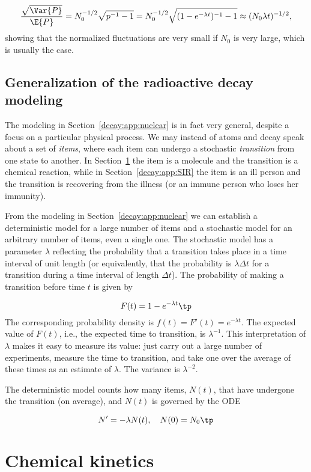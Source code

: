 \documentclass[graybox,sectrefs,envcountresetchap,open=right,final]{svmonodo}
\begin{document}
\[ \frac{\sqrt{\Var{P}}}{\E{P}} = N_0^{-1/2}\sqrt{p^{-1}-1}
= N_0^{-1/2}\sqrt{(1-e^{-\lambda t})^{-1}-1}\approx
(N_0\lambda t)^{-1/2},
\]
showing that the normalized fluctuations are very small if $N_0$ is
very large, which is usually the case.

\subsection{Generalization of the radioactive decay modeling}
\label{decay:app:waitingtime}

The modeling in Section~\ref{decay:app:nuclear} is in fact very
general, despite a focus on a particular physical process. We may
instead of atoms and decay speak about a set of \emph{items}, where each
item can undergo a stochastic \emph{transition} from one state to
another. In Section~\ref{decay:app:kinetics} the item is a molecule and
the transition is a chemical reaction, while in Section~\ref{decay:app:SIR} the item is an ill person and the transition is
recovering from the illness (or an immune person who loses her
immunity).

From the modeling in Section~\ref{decay:app:nuclear} we can establish
a deterministic model for a large number of items and a stochastic
model for an arbitrary number of items, even a single one.
The stochastic model has a parameter $\lambda$ reflecting the
probability that a transition takes place in a time interval of
unit length (or equivalently, that the probability is $\lambda\Delta t$
for a transition during a time interval of length $\Delta t$).
The probability of making a transition before time $t$ is given by

\[ F(t) = 1- e^{-\lambda t}\tp\]
The corresponding probability density is $f(t)=F'(t)=e^{-\lambda t}$.
The expected value of $F(t)$, i.e., the expected time to transition,
is $\lambda^{-1}$. This interpretation of $\lambda$ makes it easy to
measure its value: just carry out a large number of experiments,
measure the time to transition, and take one over the average of these times as
an estimate of $\lambda$.
The variance is $\lambda^{-2}$.

The deterministic model counts how many items, $N(t)$, that have
undergone the transition (on average), and $N(t)$ is governed by the ODE

\[ N^{\prime} = -\lambda N(t),\quad N(0)=N_0\tp\]

\section{Chemical kinetics}
\label{decay:app:kinetics}
\end{document}
